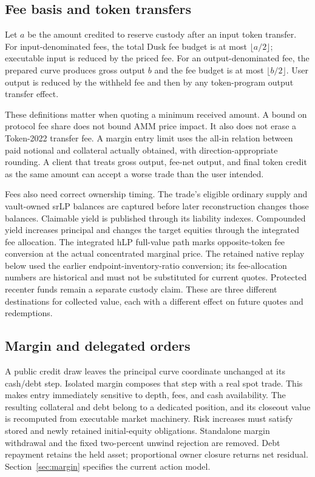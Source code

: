 \subsection{Fee basis and token transfers}

Let $a$ be the amount credited to reserve custody after an input token transfer. For input-denominated fees, the total Dusk fee budget is at most $\lfloor a/2\rfloor$; executable input is reduced by the priced fee. For an output-denominated fee, the prepared curve produces gross output $b$ and the fee budget is at most $\lfloor b/2\rfloor$. User output is reduced by the withheld fee and then by any token-program output transfer effect.

These definitions matter when quoting a minimum received amount. A bound on protocol fee share does not bound AMM price impact. It also does not erase a Token-2022 transfer fee. A margin entry limit uses the all-in relation between paid notional and collateral actually obtained, with direction-appropriate rounding. A client that treats gross output, fee-net output, and final token credit as the same amount can accept a worse trade than the user intended.

Fees also need correct ownership timing. The trade's eligible ordinary supply and vault-owned srLP balances are captured before later reconstruction changes those balances. Claimable yield is published through its liability indexes. Compounded yield increases principal and changes the target equities through the integrated fee allocation. The integrated hLP full-value path marks opposite-token fee conversion at the actual concentrated marginal price. The retained native replay below used the earlier endpoint-inventory-ratio conversion; its fee-allocation numbers are historical and must not be substituted for current quotes. Protected recenter funds remain a separate custody claim. These are three different destinations for collected value, each with a different effect on future quotes and redemptions.

\subsection{Margin and delegated orders}

A public credit draw leaves the principal curve coordinate unchanged at its cash/debt step. Isolated margin composes that step with a real spot trade. This makes entry immediately sensitive to depth, fees, and cash availability. The resulting collateral and debt belong to a dedicated position, and its closeout value is recomputed from executable market machinery. Risk increases must satisfy stored and newly retained initial-equity obligations. Standalone margin withdrawal and the fixed two-percent unwind rejection are removed. Debt repayment retains the held asset; proportional owner closure returns net residual. Section~\ref{sec:margin} specifies the current action model.

